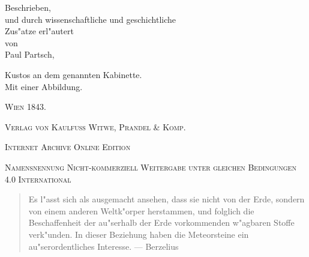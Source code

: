 \documentclass[a4paper, 11pt, oneside, polutonikogreek, german]{article}
\begin{document}
\begin{titlepage}
	{\Large Beschrieben,\\ und durch wissenschaftliche und geschichtliche \\ Zus"atze erl"autert \\ von \\ Paul Partsch,} %
	
	\vspace*{1\baselineskip} %
	
        {Kustos an dem genannten Kabinette. \\ Mit einer Abbildung.} %
    
        \vspace*{\fill}

	\vspace{1\baselineskip}

	{\scshape Wien 1843.}
	
	{\scshape{Verlag von Kaulfuss Witwe, Prandel \& Komp.}}
	
	\vspace{0.5\baselineskip} %

    \scshape Internet Archive Online Edition  %
	
	{\scshape Namensnennung Nicht-kommerziell Weitergabe unter gleichen Bedingungen 4.0 International} %
\end{titlepage}
\setlength{\parskip}{1mm plus1mm minus1mm}
\clearpage
\tableofcontents
\clearpage
\Large
\pagestyle{fancy}
\fancyhf{}
\cfoot{\frakfamily{\thepage}}
\vspace*{\fill}
\begin{quote}
   Es l"asst sich als ausgemacht ansehen, dass sie nicht von der Erde, sondern von einem anderen Weltk"orper herstammen, und folglich die Beschaffenheit der au"serhalb der Erde vorkommenden w"agbaren Stoffe verk"unden. In dieser Beziehung haben die Meteorsteine ein au"serordentliches Interesse. --- Berzelius
\end{quote}
\vspace*{\fill}
\clearpage
\section*{}
\end{document}
